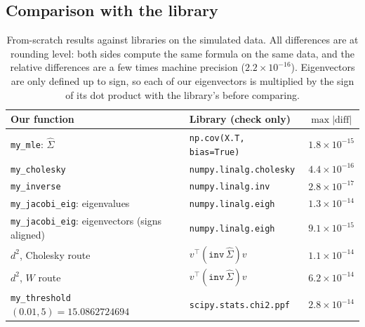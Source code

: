 \documentclass[11pt]{article}
\theoremstyle{definition}
\newcommand{\T}{^{\top}}
\begin{document}
\subsection{Comparison with the library}
\begin{table}[H]
\centering
\small
\begin{tabular}{@{}lll@{}}
\toprule
Our function & Library (check only) & $\max|\text{diff}|$ \\
\midrule
\texttt{my\_mle}: $\hat\Sigma$ & \texttt{np.cov(X.T, bias=True)} & $1.8\times10^{-15}$ \\
\texttt{my\_cholesky} & \texttt{numpy.linalg.cholesky} & $4.4\times10^{-16}$ \\
\texttt{my\_inverse} & \texttt{numpy.linalg.inv} & $2.8\times10^{-17}$ \\
\texttt{my\_jacobi\_eig}: eigenvalues & \texttt{numpy.linalg.eigh} & $1.3\times10^{-14}$ \\
\texttt{my\_jacobi\_eig}: eigenvectors (signs aligned) & \texttt{numpy.linalg.eigh} & $9.1\times10^{-15}$ \\
$d^2$, Cholesky route & $v\T(\texttt{inv}\,\hat\Sigma)v$ & $1.1\times10^{-14}$ \\
$d^2$, $W$ route & $v\T(\texttt{inv}\,\hat\Sigma)v$ & $6.2\times10^{-14}$ \\
\texttt{my\_threshold}$(0.01,5)=15.0862724694$ & \texttt{scipy.stats.chi2.ppf} & $2.8\times10^{-14}$ \\
\bottomrule
\end{tabular}
\caption{From-scratch results against libraries on the simulated data. All differences are at rounding level: both sides compute the same formula on the same data, and the relative differences are a few times machine precision ($2.2\times10^{-16}$). Eigenvectors are only defined up to sign, so each of our eigenvectors is multiplied by the sign of its dot product with the library's before comparing.}
\label{tab:simlib}
\end{table}
\end{document}
